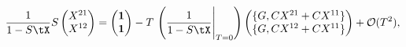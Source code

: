 \begin{equation} \label{eq:ExpansionIdentity}
    \frac{1}{1 - S\tX} S \left( \begin{matrix} 
           X^{21} \\ X^{12} \end{matrix} \right)
  =
\left( \begin{matrix} 
           \mathbf{1} \\ \mathbf{1} \end{matrix} \right)-
T\,\left(\frac{1}{1 - S \tX} \Bigg|_{T=0}\right)
\left(
\begin{matrix}
  \{G, C X^{21}+C X^{11}\} \\
  \{G, C X^{12}+C X^{11}\}
\end{matrix}
\right)
+\mathcal{O}(T^2),
\end{equation}

